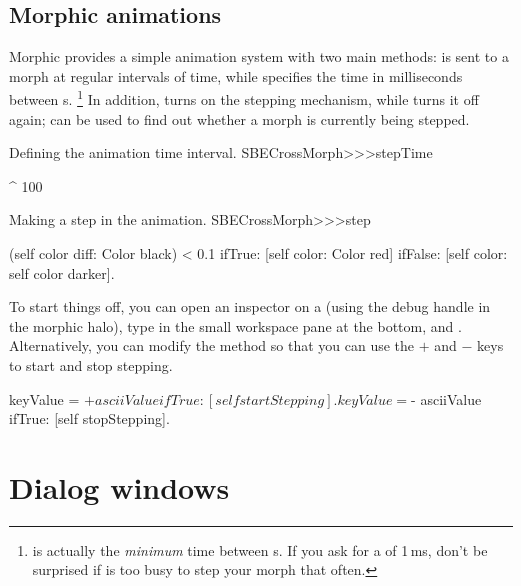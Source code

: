 \documentclass[a4paper,10pt,twoside]{book}
\begin{document}
\subsection{Morphic animations}

Morphic provides a simple animation system with two main methods:  is sent to a morph at regular intervals of time, while  specifies the time in milliseconds between s.%
\footnote{ is actually the \emph{minimum} time between s.
	If you ask for a  of 1\,ms, don't be surprised if \sq is too busy to step your morph that often.}
In addition,  turns on the stepping mechanism, while  turns it off again;   can be used to find out whether a morph is currently being stepped.

\begin{method}{Defining the animation time interval.}
SBECrossMorph>>>stepTime

	^ 100
\end{method}
\begin{method}{Making a step in the animation.}
SBECrossMorph>>>step

	(self color diff: Color black) < 0.1
		ifTrue: [self color: Color red]
		ifFalse: [self color: self color darker].
\end{method}
\noindent
To start things off, you can open an inspector on a  (using the debug handle \debugHandle{} in the morphic halo), type  in the small workspace pane at the bottom, and .
Alternatively, you can modify the  method so that you can use the $+$ and $-$ keys to start and stop stepping.


\begin{code}{}
	keyValue = $+ asciiValue
		ifTrue: [self startStepping].
	keyValue = $- asciiValue
		ifTrue: [self stopStepping].
\end{code}


\section{Dialog windows}
\end{document}
